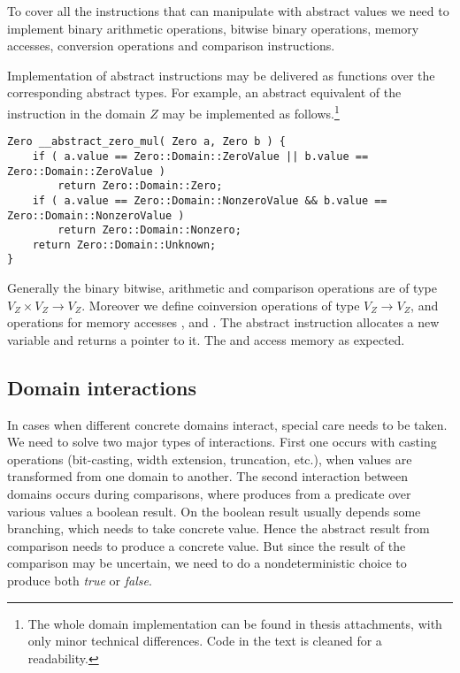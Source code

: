To cover all the \LLVM instructions that can manipulate with abstract values we
need to implement binary arithmetic operations, bitwise binary operations,
memory accesses, conversion operations and comparison instructions.

Implementation of abstract instructions may be delivered as \Cpp{} functions over
the corresponding abstract types. For example, an abstract equivalent of the
 instruction in the domain $Z$ may be implemented as follows.\footnote{The whole
 domain implementation can be found in thesis attachments, with
only minor technical differences. Code in the text is cleaned for a readability.}

\bigskip
\noindent
\begin{minipage}[bt]{\fullwidth}
\begin{verbatim}
Zero __abstract_zero_mul( Zero a, Zero b ) {
    if ( a.value == Zero::Domain::ZeroValue || b.value == Zero::Domain::ZeroValue )
        return Zero::Domain::Zero;
    if ( a.value == Zero::Domain::NonzeroValue && b.value == Zero::Domain::NonzeroValue )
        return Zero::Domain::Nonzero;
    return Zero::Domain::Unknown;
}
\end{verbatim}
\end{minipage}
\bigskip

Generally the binary bitwise, arithmetic and comparison operations are of
type $V_Z \times V_Z \to V_Z$. Moreover we define coinversion operations of type
$V_Z \to V_Z$,
and operations for memory accesses ,  and . The abstract  instruction allocates a new 
variable and returns a pointer to it. The  and  access memory as expected.

\subsection{Domain interactions} \label{sec:interactions}
In cases when different concrete domains interact, special care needs to be
taken. We need to solve two major types of interactions. First one occurs
with casting operations (bit-casting, width extension, truncation, etc.), when
values are transformed from one domain to another. The second
interaction between domains occurs during comparisons, where \LLVM produces from
a predicate over various values a boolean result. On the boolean result
usually depends some branching, which needs to take concrete
value. Hence the
abstract result from comparison needs to produce a concrete value. But since the
result of the comparison may be uncertain, we need to do a nondeterministic
choice to produce both \emph{true} or \emph{false}.

